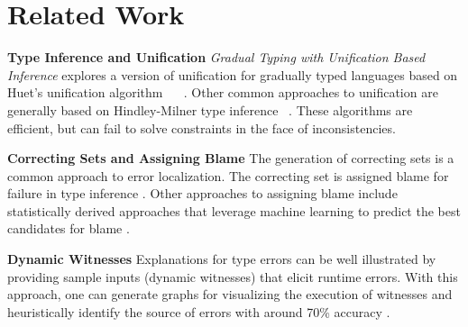 \section{Related Work}
\label{sec:related}
\textbf{Type Inference and Unification} \emph{Gradual Typing with Unification Based Inference} explores a version of unification for gradually typed languages based on Huet's unification algorithm ~\cite{GradualInfer} ~\cite{Huet}. Other common approaches to unification are generally based on Hindley-Milner type inference ~\cite{MilnerInfer}. These algorithms are efficient, but can fail to solve constraints in the face of inconsistencies.

\textbf{Correcting Sets and Assigning Blame} The generation of correcting sets is a common approach to error localization. The correcting set is assigned blame for failure in type inference \cite{sherrloc} \cite{typeinferDif} \cite{Pavlinovic2015}. Other approaches to assigning blame include statistically derived approaches that leverage machine learning to predict the best candidates for blame \cite{SeidelBlame}.

\textbf{Dynamic Witnesses} Explanations for type errors can be well illustrated by providing sample inputs (dynamic witnesses) that elicit runtime errors. With this approach, one can generate graphs for visualizing the execution of witnesses and heuristically identify the source of errors with around 70\% accuracy \cite{Seidel2016}.